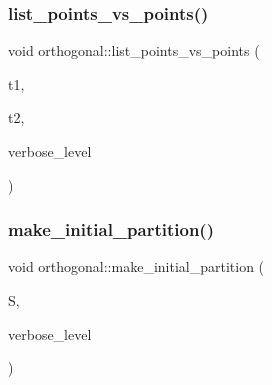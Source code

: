 \mbox{\label{classorthogonal_a80258158dfa1470b42e9036b07c7dfbb}} 
\subsubsection{\texorpdfstring{list\+\_\+points\+\_\+vs\+\_\+points()}{list\_points\_vs\_points()}}
{\footnotesize\ttfamily void orthogonal\+::list\+\_\+points\+\_\+vs\+\_\+points (\begin{DoxyParamCaption}\item[{\mbox{\hyperlink{galois_8h_a09fddde158a3a20bd2dcadb609de11dc}{I\+NT}}}]{t1,  }\item[{\mbox{\hyperlink{galois_8h_a09fddde158a3a20bd2dcadb609de11dc}{I\+NT}}}]{t2,  }\item[{\mbox{\hyperlink{galois_8h_a09fddde158a3a20bd2dcadb609de11dc}{I\+NT}}}]{verbose\+\_\+level }\end{DoxyParamCaption})}

\mbox{\label{classorthogonal_aea1837aaf362511a7a9c61b931374f58}} 
\subsubsection{\texorpdfstring{make\+\_\+initial\+\_\+partition()}{make\_initial\_partition()}}
{\footnotesize\ttfamily void orthogonal\+::make\+\_\+initial\+\_\+partition (\begin{DoxyParamCaption}\item[{\mbox{\hyperlink{classpartitionstack}{partitionstack}} \&}]{S,  }\item[{\mbox{\hyperlink{galois_8h_a09fddde158a3a20bd2dcadb609de11dc}{I\+NT}}}]{verbose\+\_\+level }\end{DoxyParamCaption})}

\mbox{\label{classorthogonal_a0c9543b702d04c8d7dbc8bc4621a6c70}} 
